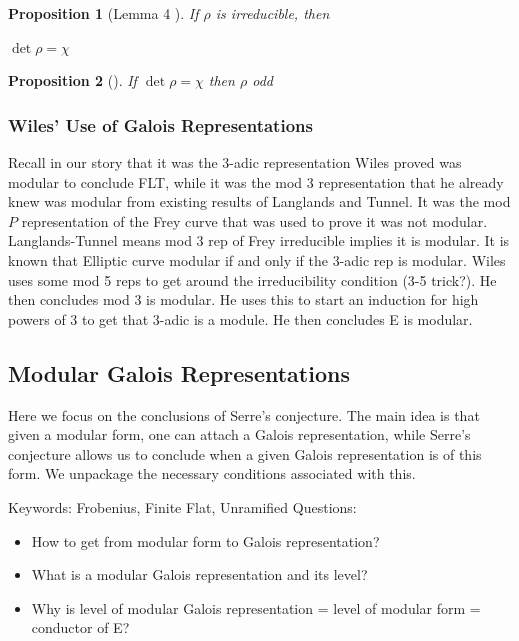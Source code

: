 \documentclass{article}
\newtheorem{proposition}{Proposition}[section]
\theoremstyle{definition}
\theoremstyle{definition}
\theoremstyle{definition}
\begin{document}
\begin{proposition}[Lemma 4 \cite{Serre}] If $\rho$ is irreducible, then
    
$\det\rho=\chi$

\end{proposition}
    
\begin{proposition}[\cite{Serre}]
    
If $\det\rho=\chi$ then $\rho$ odd
\end{proposition}

\subsubsection{Wiles' Use of Galois Representations}
Recall in our story that it was the $3$-adic representation Wiles proved was modular to conclude FLT, while it was the mod 3 representation that he already knew was modular from existing results of Langlands and Tunnel. It was the mod $P$ representation of the Frey curve that was used to prove it was not modular.
\newline\newline
Langlands-Tunnel means mod 3 rep of Frey irreducible implies it is modular. It is known that Elliptic curve modular if and only if the 3-adic rep is modular.
\newline\newline
Wiles uses some mod 5 reps to get around the irreducibility condition (3-5 trick?). He then concludes mod 3 is modular. He uses this to start an induction for high powers of 3 to get that 3-adic is a module. He then concludes E is modular.



\subsection{Modular Galois Representations}

Here we focus on the conclusions of Serre's conjecture. The main idea is that given a modular form, one can attach a Galois representation, while Serre's conjecture allows us to conclude when a given Galois representation is of this form. We unpackage the necessary conditions associated with this.



Keywords: Frobenius, Finite Flat, Unramified
\newline\newline
Questions:
\begin{itemize}
    \item How to get from modular form to Galois representation?
    \item What is a modular Galois representation and its level?
    \item Why is level of modular Galois representation = level of modular form = conductor of E?
\end{itemize}
\end{document}
